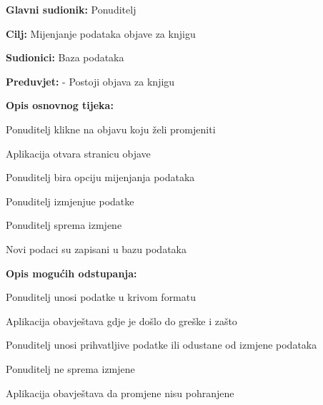                    \noindent {}
					\begin{packed_item}
	
						\item \textbf{Glavni sudionik: } Ponuditelj
						\item  \textbf{Cilj:} Mijenjanje podataka objave za knjigu
						\item  \textbf{Sudionici:} Baza podataka
						\item  \textbf{Preduvjet:} - Postoji objava za knjigu
						\item  \textbf{Opis osnovnog tijeka:}
						
						\item[] \begin{packed_enum}
	
							\item Ponuditelj klikne na objavu koju želi promjeniti
                            \item Aplikacija otvara stranicu objave
							\item Ponuditelj bira opciju mijenjanja podataka
                            \item Ponuditelj izmjenjue podatke
                            \item Ponuditelj sprema izmjene
                            \item Novi podaci su zapisani u bazu podataka
						\end{packed_enum}
						
						\item  \textbf{Opis mogućih odstupanja:}
						
						\item[] \begin{packed_item}
	
							\item[2.a] Ponuditelj unosi podatke u krivom formatu
							\item[] \begin{packed_enum}
								
								\item Aplikacija obavještava gdje je došlo do greške i zašto
								\item Ponuditelj unosi prihvatljive podatke ili odustane od izmjene podataka
								
							\end{packed_enum}

                            \item[2.b] Ponuditelj ne sprema izmjene
                            \item[] \begin{packed_enum}

                                \item Aplikacija obavještava da promjene nisu pohranjene
                            \end{packed_enum}
						\end{packed_item}
					\end{packed_item}

